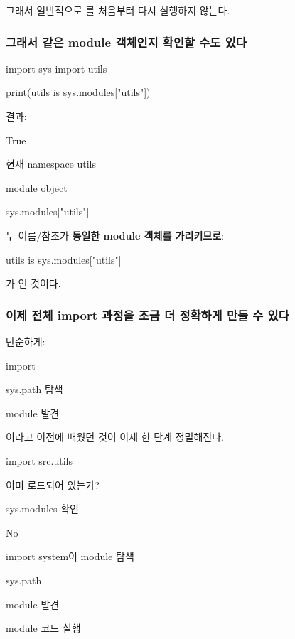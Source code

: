 그래서 일반적으로 를 처음부터 다시 실행하지 않는다.

\subsubsection{그래서 같은 module 객체인지 확인할 수도 있다}

\begin{dhkcode}
import sys
import utils

print(utils is sys.modules["utils"])
\end{dhkcode}

결과:

\begin{dhkzsh}
True
\end{dhkzsh}

\begin{dhksmry}[centered]
현재 namespace
utils

\da

module object

\ua

sys.modules["utils"]
\end{dhksmry}

두 이름/참조가 \textbf{동일한 module 객체를 가리키므로}:

\begin{dhkcode}
utils is sys.modules["utils"]
\end{dhkcode}

가 인 것이다.

\subsubsection{이제 전체 import 과정을 조금 더 정확하게 만들 수 있다}

단순하게:

\begin{dhksmry}[centered]
import

\da

sys.path 탐색

\da

module 발견
\end{dhksmry}

이라고 이전에 배웠던 것이 이제 한 단계 정밀해진다.

\begin{dhksmry}[centered]
import src.utils

\da

이미 로드되어 있는가?

\da

sys.modules 확인

\da

No

\da

import system이 module 탐색

\da

sys.path

\da

module 발견

\da

module 코드 실행
\end{dhksmry}


